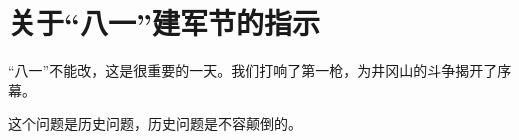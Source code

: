 \section[关于“八一”建军节的指示（一九六七年七月）]{关于“八一”建军节的指示}


“八一”不能改，这是很重要的一天。我们打响了第一枪，为井冈山的斗争揭开了序幕。

这个问题是历史问题，历史问题是不容颠倒的。


